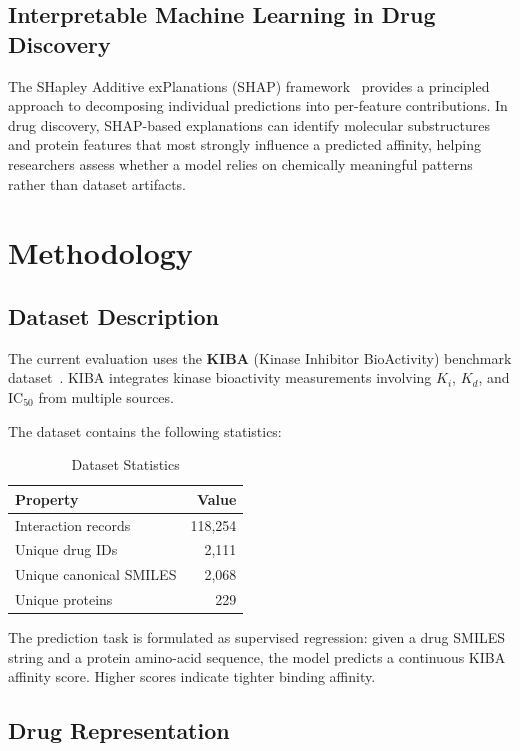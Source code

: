 \documentclass[10pt,conference]{IEEEtran}
\begin{document}
\subsection{Interpretable Machine Learning in Drug Discovery}

The SHapley Additive exPlanations (SHAP) framework~\cite{shap2017,treeshap2020} provides a principled approach to decomposing individual predictions into per-feature contributions. In drug discovery, SHAP-based explanations can identify molecular substructures and protein features that most strongly influence a predicted affinity, helping researchers assess whether a model relies on chemically meaningful patterns rather than dataset artifacts.

\section{Methodology}
\label{sec:method}

\subsection{Dataset Description}
\label{subsec:dataset}

The current evaluation uses the \textbf{KIBA} (Kinase Inhibitor BioActivity) benchmark dataset~\cite{kiba2014}. KIBA integrates kinase bioactivity measurements involving $K_i$, $K_d$, and IC$_{50}$ from multiple sources.

The dataset contains the following statistics:

\begin{table}[H]
\centering
\caption{Dataset Statistics}
\label{tab:stats}
\begin{tabular}{@{}l r@{}}
\toprule
\textbf{Property} & \textbf{Value} \\
\midrule
Interaction records & 118,254 \\
Unique drug IDs & 2,111 \\
Unique canonical SMILES & 2,068 \\
Unique proteins & 229 \\
\bottomrule
\end{tabular}
\end{table}

The prediction task is formulated as supervised regression: given a drug SMILES string and a protein amino-acid sequence, the model predicts a continuous KIBA affinity score. Higher scores indicate tighter binding affinity.

\subsection{Drug Representation}
\label{subsec:drug}
\end{document}
